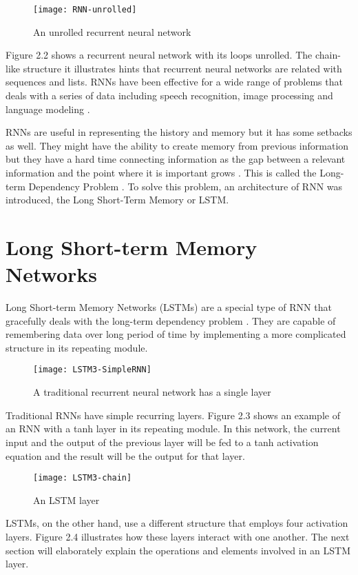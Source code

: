     \begin{figure}[H]
    \centering
    \texttt{[image: RNN-unrolled]}
    \caption{An unrolled recurrent neural network \citep{olah2015understanding}}
    \end{figure}
    Figure 2.2 shows a recurrent neural network with its loops unrolled. The chain-like structure it illustrates hints that recurrent neural networks are related with sequences and lists. RNNs have been effective for a wide range of problems that deals with a series of data including speech recognition, image processing and language modeling \citep{olah2015understanding}.

    RNNs are useful in representing the history and memory but it has some setbacks as well. They might have the ability to create memory from previous information but they have a hard time connecting information as the gap between a relevant information and the point where it is important grows \citep{graves2012supervised}. This is called the Long-term Dependency Problem \citep{bengio1994learning}. To solve this problem, an architecture of RNN was introduced, the Long Short-Term Memory or LSTM.

\section{Long Short-term Memory Networks}
    Long Short-term Memory Networks (LSTMs) are a special type of RNN that gracefully deals with the long-term dependency problem \citep{hochreiter1997long}. They are capable of remembering data over long period of time by implementing a more complicated structure in its repeating module.

    \begin{figure}[H]
    \centering
    \texttt{[image: LSTM3-SimpleRNN]}
    \caption{A traditional recurrent neural network has a single layer \citep{olah2015understanding}}
    \end{figure}
    Traditional RNNs have simple recurring layers. Figure 2.3 shows an example of an RNN with a tanh layer in its repeating module. In this network, the current input and the output of the previous layer will be fed to a tanh activation equation and the result will be the output for that layer.
    
    \begin{figure}[H]
    \centering
    \texttt{[image: LSTM3-chain]}
    \caption{An LSTM layer \citep{olah2015understanding}}
    \end{figure}
    LSTMs, on the other hand, use a different structure that employs four activation layers. Figure 2.4 illustrates how these layers interact with one another. The next section will elaborately explain the operations and elements involved in an LSTM layer.

